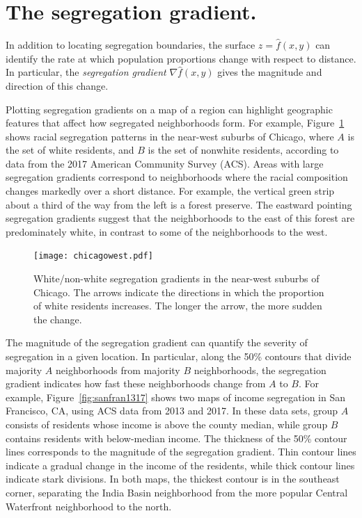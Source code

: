 \documentclass{article}
\theoremstyle{theorem}
\theoremstyle{definition}
\begin{document}
\section{The segregation gradient.}

In addition to locating segregation boundaries, the surface $z = \hat{f}(x,y)$ can identify the rate at which population proportions change with respect to distance. In particular, the \textit{segregation gradient} $\nabla \hat{f}(x,y)$ gives the magnitude and direction of this change.

Plotting segregation gradients on a map of a region can highlight geographic features that affect how segregated neighborhoods form. For example, Figure~\ref{fig:chicagowest} shows racial segregation patterns in the near-west suburbs of Chicago, where $A$ is the set of white residents, and $B$ is the set of nonwhite residents, according to data from the 2017 American Community Survey (ACS). Areas with large segregation gradients correspond to neighborhoods where the racial composition changes markedly over a short distance. For example, the vertical green strip about a third of the way from the left is a forest preserve. The eastward pointing segregation gradients suggest that the neighborhoods to the east of this forest are predominately white, in contrast to some of the neighborhoods to the west.

\begin{figure}[t!]
  \texttt{[image: chicagowest.pdf]}
  \caption{White/non-white segregation gradients in the near-west suburbs of Chicago. The arrows indicate the directions in which the proportion of white residents increases. The longer the arrow, the more sudden the change.}
  \label{fig:chicagowest}
\end{figure}

The magnitude of the segregation gradient can quantify the severity of segregation in a given location. In particular, along the 50\% contours that divide majority $A$ neighborhoods from majority $B$ neighborhoods, the segregation gradient indicates how fast these neighborhoods change from $A$ to $B$. For example, Figure~\ref{fig:sanfran1317} shows two maps of income segregation in San Francisco, CA, using ACS data from 2013 and 2017. In these data sets, group $A$ consists of residents whose income is above the county median, while group $B$ contains residents with below-median income. The thickness of the 50\% contour lines corresponds to the magnitude of the segregation gradient. Thin contour lines indicate a gradual change in the income of the residents, while thick contour lines indicate stark divisions. In both maps, the thickest contour is in the southeast corner, separating the India Basin neighborhood from the more popular Central Waterfront neighborhood to the north.
\end{document}
